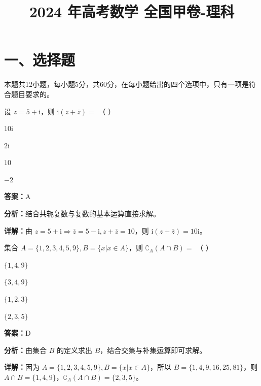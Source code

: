 ﻿\title{2024 年高考数学 全国甲卷-理科}
\date{}
\maketitle

\section*{一、选择题}
本题共12小题，每小题5分，共60分，在每小题给出的四个选项中，只有一项是符合题目要求的。

\begin{question}[points=5]
设 $z=5+\mathrm{i}$，则 $\mathrm{i}(z+\overline{z})=$ （   ）
\begin{choices}
  \item $10\mathrm{i}$
  \item $2\mathrm{i}$
  \item $10$
  \item $-2$
\end{choices}
\begin{solution}
\textbf{答案：}A

\textbf{分析：}结合共轭复数与复数的基本运算直接求解。

\textbf{详解：}由 $z=5+\mathrm{i}\Rightarrow\overline{z}=5-\mathrm{i},z+\overline{z}=10$，则 $\mathrm{i}(z+\overline{z})=10\mathrm{i}$。
\end{solution}
\end{question}

\begin{question}[points=5]
集合 $A=\{1,2,3,4,5,9\},B=\{x|x\in A\}$，则 $\complement_A(A\cap B)=$ （   ）
\begin{choices}
  \item $\{1,4,9\}$
  \item $\{3,4,9\}$
  \item $\{1,2,3\}$
  \item $\{2,3,5\}$
\end{choices}
\begin{solution}
\textbf{答案：}D

\textbf{分析：}由集合 $B$ 的定义求出 $B$，结合交集与补集运算即可求解。

\textbf{详解：}因为 $A=\{1,2,3,4,5,9\},B=\{x|x\in A\}$，所以 $B=\{1,4,9,16,25,81\}$，则 $A\cap B=\{1,4,9\}$，$\complement_A(A\cap B)=\{2,3,5\}$。
\end{solution}
\end{question}

